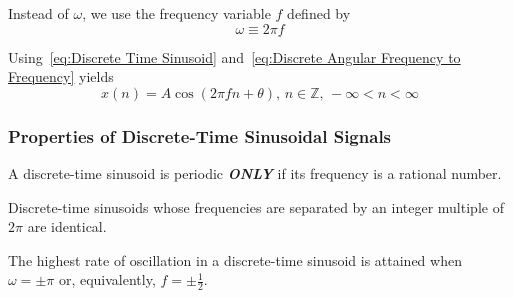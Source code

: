 Instead of $\omega$, we use the frequency variable $f$ defined by
\begin{equation}\label{eq:Discrete Angular Frequency to Frequency}
  \omega \equiv 2 \pi f
\end{equation}

Using~\eqref{eq:Discrete Time Sinusoid} and~\eqref{eq:Discrete Angular Frequency to Frequency} yields
\begin{equation}\label{eq:Discrete Frequency Sinusoid}
  x(n) = A \cos \left( 2 \pi fn + \theta \right) \text{, } n \in \mathbb{Z} \text{, } -\infty < n < \infty
\end{equation}

\subsubsection{Properties of Discrete-Time Sinusoidal Signals}\label{subsubsec:Properties Discrete-Time Sinusoids}
\begin{propertylist}
\item A discrete-time sinusoid is periodic \textbf{\emph{ONLY}} if its frequency is a rational number.
\item Discrete-time sinusoids whose frequencies are separated by an integer multiple of $2\pi$ are identical.
\item The highest rate of oscillation in a discrete-time sinusoid is attained when $\omega = \pm \pi$ or, equivalently, $f= \pm \frac{1}{2}$.
\end{propertylist}

